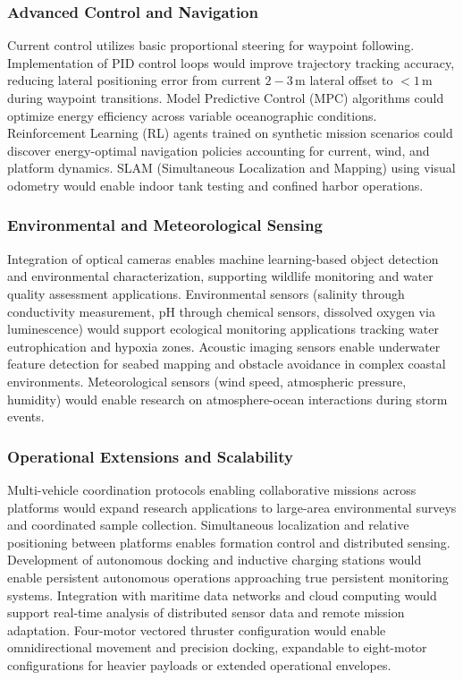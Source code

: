 \documentclass[conference]{IEEEtran}
\begin{document}
\subsubsection{Advanced Control and Navigation}
Current control utilizes basic proportional steering for waypoint following. Implementation of PID control loops would improve trajectory tracking accuracy, reducing lateral positioning error from current $2-3 \, \mathrm{m}$ lateral offset to $<1 \, \mathrm{m}$ during waypoint transitions. Model Predictive Control (MPC) algorithms could optimize energy efficiency across variable oceanographic conditions. Reinforcement Learning (RL) agents trained on synthetic mission scenarios could discover energy-optimal navigation policies accounting for current, wind, and platform dynamics. SLAM (Simultaneous Localization and Mapping) using visual odometry would enable indoor tank testing and confined harbor operations.

\subsubsection{Environmental and Meteorological Sensing}
Integration of optical cameras enables machine learning-based object detection and environmental characterization, supporting wildlife monitoring and water quality assessment applications. Environmental sensors (salinity through conductivity measurement, pH through chemical sensors, dissolved oxygen via luminescence) would support ecological monitoring applications tracking water eutrophication and hypoxia zones. Acoustic imaging sensors enable underwater feature detection for seabed mapping and obstacle avoidance in complex coastal environments. Meteorological sensors (wind speed, atmospheric pressure, humidity) would enable research on atmosphere-ocean interactions during storm events.

\subsubsection{Operational Extensions and Scalability}
Multi-vehicle coordination protocols enabling collaborative missions across platforms would expand research applications to large-area environmental surveys and coordinated sample collection. Simultaneous localization and relative positioning between platforms enables formation control and distributed sensing. Development of autonomous docking and inductive charging stations would enable persistent autonomous operations approaching true persistent monitoring systems. Integration with maritime data networks and cloud computing would support real-time analysis of distributed sensor data and remote mission adaptation. Four-motor vectored thruster configuration would enable omnidirectional movement and precision docking, expandable to eight-motor configurations for heavier payloads or extended operational envelopes.
\end{document}
